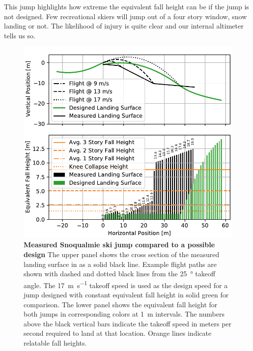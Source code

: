 \documentclass{article}
\begin{document}
This jump highlights how extreme the equivalent fall height can be if the jump
is not designed. Few recreational skiers will jump out of a four story window,
snow landing or not. The likelihood of injury is quite clear and our internal
altimeter tells us so.
%
\begin{figure}
  \centering
  \includegraphics[width=5.25in]{figures/salvini-v-snoqualmie.pdf}
  \caption{\textbf{Measured Snoqualmie ski jump compared to a possible design}
  The upper panel shows the cross section of the measured landing surface in as
  a solid black line. Example flight paths are shown with dashed and dotted
  black lines from the 25~\si{\degree} takeoff angle. The
  17~\si{\meter\per\second} takeoff speed is used as the design speed for a
  jump designed with constant equivalent fall height in solid green for
  comparison. The lower panel shows the equivalent fall height for both jumps
  in corresponding colors at 1~\si{\meter} intervals. The numbers above the
  black vertical bars indicate the takeoff speed in meters per second required
  to land at that location. Orange lines indicate relatable fall heights.}
  \label{fig:salvini-v-snoqualmie}
\end{figure}
\end{document}
